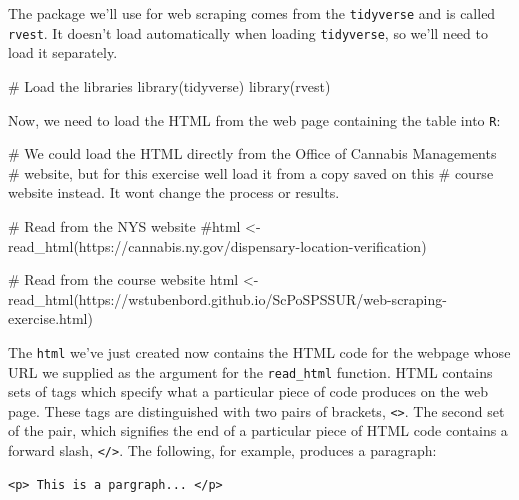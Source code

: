 \documentclass[
  letterpaper,
]{book}
\newenvironment{Shaded}{\begin{snugshade}}{\end{snugshade}}
\newcommand{\CommentTok}[1]{\textcolor[rgb]{0.37,0.37,0.37}{#1}}
\newcommand{\FunctionTok}[1]{\textcolor[rgb]{0.28,0.35,0.67}{#1}}
\newcommand{\NormalTok}[1]{\textcolor[rgb]{0.00,0.23,0.31}{#1}}
\newcommand{\OtherTok}[1]{\textcolor[rgb]{0.00,0.23,0.31}{#1}}
\newcommand{\StringTok}[1]{\textcolor[rgb]{0.13,0.47,0.30}{#1}}
\begin{document}
The package we'll use for web scraping comes from the \texttt{tidyverse}
and is called \texttt{rvest}. It doesn't load automatically when loading
\texttt{tidyverse}, so we'll need to load it separately.

\begin{Shaded}
\begin{Highlighting}[]
\CommentTok{\# Load the libraries}
\FunctionTok{library}\NormalTok{(tidyverse)}
\FunctionTok{library}\NormalTok{(rvest)}
\end{Highlighting}
\end{Shaded}

Now, we need to load the HTML from the web page containing the table
into \texttt{R}:

\begin{Shaded}
\begin{Highlighting}[]
\CommentTok{\# We could load the HTML directly from the Office of Cannabis Management\textquotesingle{}s  }
\CommentTok{\# website, but for this exercise we\textquotesingle{}ll load it from a copy saved on this }
\CommentTok{\# course website instead.  It won\textquotesingle{}t change the process or results.}

\CommentTok{\# Read from the NYS website}
\CommentTok{\#html \textless{}{-} read\_html(\textquotesingle{}https://cannabis.ny.gov/dispensary{-}location{-}verification\textquotesingle{})}

\CommentTok{\# Read from the course website}
\NormalTok{html }\OtherTok{\textless{}{-}} \FunctionTok{read\_html}\NormalTok{(}\StringTok{\textquotesingle{}https://wstubenbord.github.io/ScPoSPSSUR/web{-}scraping{-}exercise.html\textquotesingle{}}\NormalTok{)}
\end{Highlighting}
\end{Shaded}

The \texttt{html} we've just created now contains the HTML code for the
webpage whose URL we supplied as the argument for the
\texttt{read\_html} function. HTML contains sets of tags which specify
what a particular piece of code produces on the web page. These tags are
distinguished with two pairs of brackets,
\texttt{\textless{}\textgreater{}}. The second set of the pair, which
signifies the end of a particular piece of HTML code contains a forward
slash, \texttt{\textless{}/\textgreater{}}. The following, for example,
produces a paragraph:

\begin{verbatim}
<p> This is a pargraph... </p>
\end{verbatim}
\end{document}
